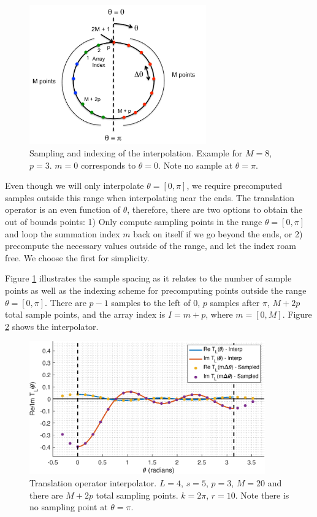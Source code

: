  \begin{figure}[H] 
   \centering
   \includegraphics[width=3in]{FastMultipoleMethod/Figures/indexing} 
   \caption{Sampling and indexing of the interpolation.  Example for $M = 8$, $p = 3$.  $m=0$ corresponds to $\theta = 0$. Note no sample at $\theta=\pi$.}
   \label{fig4}
\end{figure}

Even though we will only interpolate $\theta = [0, \pi]$, we require precomputed samples outside this range when interpolating near the ends.  The translation operator is an even function of $\theta$, therefore, there are two options to obtain the out of bounds points: 1) Only compute sampling points in the range $\theta = [0, \pi]$ and loop the summation index $m$ back on itself if we go beyond the ends, or 2) precompute the necessary values outside of the range, and let the index roam free. We choose the first for simplicity.  

Figure \ref{fig4} illustrates the sample spacing as it relates to the number of sample points as well as the indexing scheme for precomputing points outside the range $\theta = [0, \pi]$.  There are $p-1$ samples to the left of 0, $p$ samples after $\pi$, $M + 2p$ total sample points, and the array index is $I = m + p$, where $m = [0,M]$.  Figure \ref{fig5} shows the interpolator.  

 \begin{figure}[H] 
   \centering
   \includegraphics[width=4in]{FastMultipoleMethod/Figures/TLthetainterp} 
   \caption{Translation operator interpolator.  $L = 4$, $s = 5$, $p = 3$, $M = 20$ and there are $M + 2p$ total sampling points.  $k = 2\pi$, $r = 10$. Note there is no sampling point at $\theta = \pi$.}
   \label{fig5}
\end{figure}

